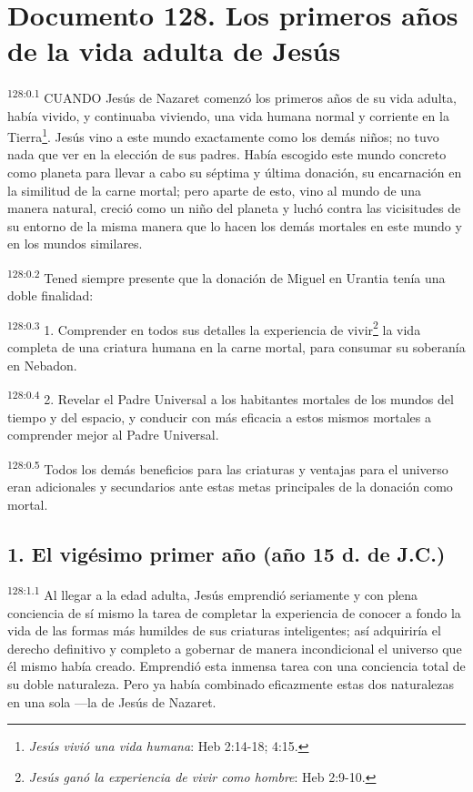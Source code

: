 \chapter{Documento 128. Los primeros años de la vida adulta de Jesús}
\par 
\textsuperscript{128:0.1} CUANDO Jesús de Nazaret comenzó los primeros años de su vida adulta, había vivido, y continuaba viviendo, una vida humana normal y corriente en la Tierra\footnote{\textit{Jesús vivió una vida humana}: Heb 2:14-18; 4:15.}. Jesús vino a este mundo exactamente como los demás niños; no tuvo nada que ver en la elección de sus padres. Había escogido este mundo concreto como planeta para llevar a cabo su séptima y última donación, su encarnación en la similitud de la carne mortal; pero aparte de esto, vino al mundo de una manera natural, creció como un niño del planeta y luchó contra las vicisitudes de su entorno de la misma manera que lo hacen los demás mortales en este mundo y en los mundos similares.

\par 
\textsuperscript{128:0.2} Tened siempre presente que la donación de Miguel en Urantia tenía una doble finalidad:

\par 
\textsuperscript{128:0.3} 1. Comprender en todos sus detalles la experiencia de vivir\footnote{\textit{Jesús ganó la experiencia de vivir como hombre}: Heb 2:9-10.} la vida completa de una criatura humana en la carne mortal, para consumar su soberanía en Nebadon.

\par 
\textsuperscript{128:0.4} 2. Revelar el Padre Universal a los habitantes mortales de los mundos del tiempo y del espacio, y conducir con más eficacia a estos mismos mortales a comprender mejor al Padre Universal.

\par 
\textsuperscript{128:0.5} Todos los demás beneficios para las criaturas y ventajas para el universo eran adicionales y secundarios ante estas metas principales de la donación como mortal.

\section*{1. El vigésimo primer año (año 15 d. de J.C.)}
\par 
\textsuperscript{128:1.1} Al llegar a la edad adulta, Jesús emprendió seriamente y con plena conciencia de sí mismo la tarea de completar la experiencia de conocer a fondo la vida de las formas más humildes de sus criaturas inteligentes; así adquiriría el derecho definitivo y completo a gobernar de manera incondicional el universo que él mismo había creado. Emprendió esta inmensa tarea con una conciencia total de su doble naturaleza. Pero ya había combinado eficazmente estas dos naturalezas en una sola ---la de Jesús de Nazaret.

